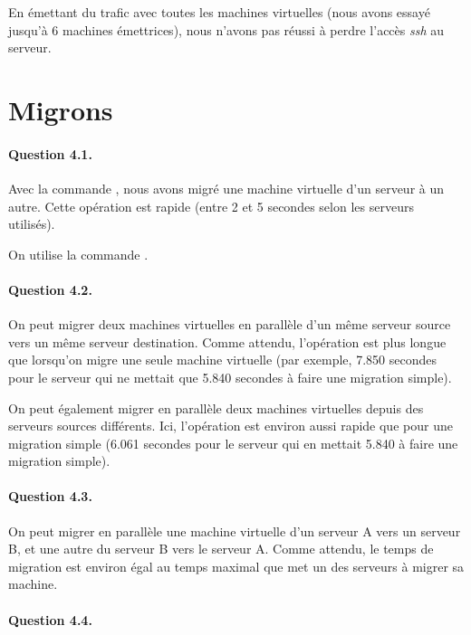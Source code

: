\documentclass[12pt]{article}
\begin{document}
En émettant du trafic avec toutes les machines virtuelles (nous avons essayé jusqu'à 6 machines émettrices), nous n'avons pas réussi à perdre l'accès \textit{ssh} au serveur.

\section{Migrons}
\paragraph{Question 4.1.}


Avec la commande , nous avons migré une machine virtuelle d'un serveur à un autre. Cette opération est rapide (entre 2 et 5 secondes selon les serveurs utilisés).

On utilise la commande .

\paragraph{Question 4.2.}

On peut migrer deux machines virtuelles en parallèle d'un même serveur source vers un même serveur destination. Comme attendu, l'opération est plus longue que lorsqu'on migre une seule machine virtuelle (par exemple, 7.850 secondes pour le serveur qui ne mettait que 5.840 secondes à faire une migration simple).


On peut également migrer en parallèle deux machines virtuelles depuis des serveurs sources différents. Ici, l'opération est environ aussi rapide que pour une migration simple (6.061 secondes pour le serveur qui en mettait 5.840 à faire une migration simple).



\paragraph{Question 4.3.}

On peut migrer en parallèle une machine virtuelle d'un serveur A vers un serveur B, et une autre du serveur B vers le serveur A. Comme attendu, le temps de migration est environ égal au temps maximal que met un des serveurs à migrer sa machine. 

\paragraph{Question 4.4.}
\end{document}
